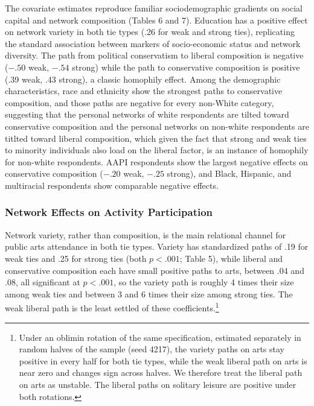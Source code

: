 \documentclass[
  12pt
]{article}
\begin{document}
The covariate estimates reproduce familiar sociodemographic gradients on social capital and network composition (Tables 6 and 7). Education has a positive effect on network variety in both tie types (.26 for weak and strong ties), replicating the standard association between markers of socio-economic status and network diversity. The path from political conservatism to liberal composition is negative ($-.50$ weak, $-.54$ strong) while the path to conservative composition is positive (.39 weak, .43 strong), a classic homophily effect. Among the demographic characteristics, race and ethnicity show the strongest paths to conservative composition, and those paths are negative for every non-White category, suggesting that the personal networks of white respondents are tilted toward conservative composition and the personal networks on non-white respondents are titlted toward liberal composition, which given the fact that strong and weak ties to minority individuals also load on the liberal factor, is an instance of homophily for non-white respondents. AAPI respondents show the largest negative effects on conservative composition ($-.20$ weak, $-.25$ strong), and Black, Hispanic, and multiracial respondents show comparable negative effects.

\subsubsection{Network Effects on Activity Participation}\label{network-effects-on-activity-participation}

Network variety, rather than composition, is the main relational channel for public arts attendance in both tie types. Variety has standardized paths of .19 for weak ties and .25 for strong ties (both $p < .001$; Table 5), while liberal and conservative composition each have small positive paths to arts, between .04 and .08, all significant at $p < .001$, so the variety path is roughly 4 times their size among weak ties and between 3 and 6 times their size among strong ties. The weak liberal path is the least settled of these coefficients.\footnote{Under an oblimin rotation of the same specification, estimated separately in random halves of the sample (seed 4217), the variety paths on arts stay positive in every half for both tie types, while the weak liberal path on arts is near zero and changes sign across halves. We therefore treat the liberal path on arts as unstable. The liberal paths on solitary leisure are positive under both rotations.}
\end{document}
